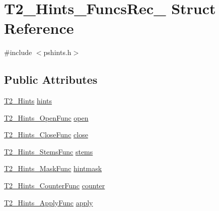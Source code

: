 \hypertarget{struct_t2___hints___funcs_rec__}{\section{T2\-\_\-\-Hints\-\_\-\-Funcs\-Rec\-\_\- Struct Reference}
\label{struct_t2___hints___funcs_rec__}
}


{\ttfamily \#include $<$pshints.\-h$>$}

\subsection*{Public Attributes}
\begin{DoxyCompactItemize}
\item 
\hyperlink{pshints_8h_af8b52db788301c01e97599916a2c819e}{T2\-\_\-\-Hints} \hyperlink{struct_t2___hints___funcs_rec___af8daab694889bede5a513fbae5f86e25}{hints}
\item 
\hyperlink{pshints_8h_a4fd2d49ab2b86a88e4e881959d45f86e}{T2\-\_\-\-Hints\-\_\-\-Open\-Func} \hyperlink{struct_t2___hints___funcs_rec___a1a5e0b296ee2e2ae6711b3ee35e5fcd9}{open}
\item 
\hyperlink{pshints_8h_a93cc8acd8dce12998bbdeabce5a5278f}{T2\-\_\-\-Hints\-\_\-\-Close\-Func} \hyperlink{struct_t2___hints___funcs_rec___a7e50e26fd55254044bc9f2ba62574352}{close}
\item 
\hyperlink{pshints_8h_a090a335d4dad20bb0607dcefa667c75f}{T2\-\_\-\-Hints\-\_\-\-Stems\-Func} \hyperlink{struct_t2___hints___funcs_rec___a12bfd8bae5d3df8f570fcdfb70c00139}{stems}
\item 
\hyperlink{pshints_8h_a521ac203e2ed63995555da5fa845c60f}{T2\-\_\-\-Hints\-\_\-\-Mask\-Func} \hyperlink{struct_t2___hints___funcs_rec___af50d0cadda7033d7dbd27a199ccfcdd4}{hintmask}
\item 
\hyperlink{pshints_8h_af65d0cb282888d91ee28b07e9a2c6797}{T2\-\_\-\-Hints\-\_\-\-Counter\-Func} \hyperlink{struct_t2___hints___funcs_rec___ad9d856a64b4a8556fc8d74bae1779e11}{counter}
\item 
\hyperlink{pshints_8h_a8f80325664a10068118a121596ea517a}{T2\-\_\-\-Hints\-\_\-\-Apply\-Func} \hyperlink{struct_t2___hints___funcs_rec___abaf12efb416bd79cf4ce72b13e6fc68f}{apply}
\end{DoxyCompactItemize}


